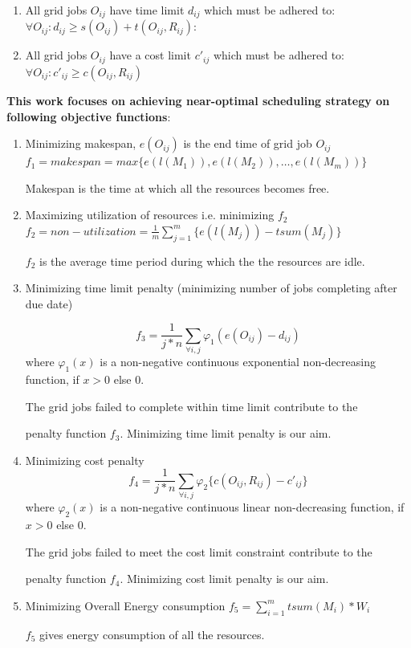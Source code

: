 \begin{enumerate}
  \item All grid jobs $O_{ij}$ have time limit $d_{ij}$ which must be adhered to:
  \subitem $ \forall O_{ij} : d_{ij} \geq s(O_{ij}) + t(O_{ij},R_{ij}) $:
  \item All grid jobs $O_{ij}$ have a cost limit  $c'_{ij}$ which must be adhered to: 
  \subitem $\forall O_{ij} : c'_{ij} \geq c(O_{ij},R_{ij}) $
  
\end{enumerate}
\textbf{This work focuses on achieving near-optimal scheduling strategy on following objective functions}:
\begin{enumerate}
  \item Minimizing makespan, $e(O_{ij})$ is the end time of grid job $O_{ij}$
  \subitem $ f_1 =makespan = max\{e(l(M_1)),e(l(M_2)),\ldots,e(l(M_m)) \}$
\begin{framed}
Makespan is the time at which all the resources becomes free.
\end{framed}
  \item Maximizing utilization of resources i.e. minimizing $f_2$
  \subitem $ f_2 = non-utilization = \frac{1}{m} \sum_{j=1}^{m}  \{e(l(M_j)) - tsum (M_j)\}$
\begin{framed}
$f_2$ is the average time period during which the the resources are idle.
\end{framed}
  \item Minimizing time limit penalty (minimizing number of jobs completing after due date)

$$
f_3 = \frac{1}{j*n}  \sum_{\forall i,j} \varphi _1 (e(O_{ij}) - d_{ij}) 
$$
where $\varphi _1(x)$ is a non-negative continuous exponential non-decreasing function, if $x > 0$ else $0$.

\begin{framed}
The grid jobs failed to complete within time limit contribute to the \par penalty function $f_3$. Minimizing time limit penalty is our aim.
\end{framed}
  \item Minimizing cost penalty 
$$
f_4 = \frac{1}{j*n}  \sum_{\forall i,j} \varphi _2 \{c(O_{ij},R_{ij}) - c'_{ij}\} 
$$
where $\varphi _2(x)$ is a non-negative continuous linear non-decreasing function, if $x > 0$ else $0$.

\begin{framed}
The grid jobs failed to meet the cost limit constraint contribute to the \par penalty function $f_4$. Minimizing cost limit penalty is our aim.
\end{framed}
  \item Minimizing Overall Energy consumption
  \subitem $f_5 = \sum_{i=1}^{m} tsum(M_i) * W_i$
\begin{framed}
$f_5$ gives energy consumption of all the resources.
\end{framed}
\end{enumerate}

